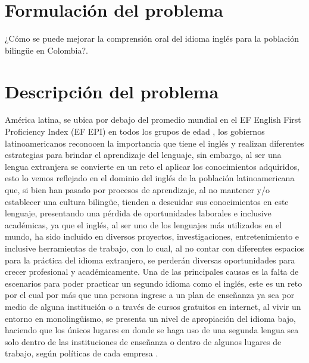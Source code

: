 \section{Formulación del problema}
¿Cómo se puede mejorar la comprensión oral del idioma inglés para la población bilingüe en Colombia?.
\medskip

\section{Descripción del problema}
América latina, se ubica por debajo del promedio mundial en el EF English First Proficiency Index (EF EPI) en todos los grupos de edad \cite{icfes2022informe}, los gobiernos latinoamericanos reconocen la importancia que tiene el inglés y realizan diferentes estrategias para brindar el aprendizaje del lenguaje, sin embargo, al ser una lengua extranjera se convierte en un reto el aplicar los conocimientos adquiridos, esto lo vemos reflejado en el dominio del inglés de la población latinoamericana que, si bien han pasado por procesos de aprendizaje, al no mantener y/o establecer una cultura bilingüe, tienden a descuidar sus conocimientos en este lenguaje, presentando una pérdida de oportunidades laborales e inclusive académicas, ya que el inglés, al ser uno de los lenguajes más utilizados en el mundo, ha sido incluido en diversos proyectos, investigaciones, entretenimiento e inclusive herramientas de trabajo, con lo cual, al no contar con diferentes espacios para la práctica del idioma extranjero, se perderán diversas oportunidades para crecer profesional y académicamente. Una de las principales causas es la falta de escenarios para poder practicar un segundo idioma como el inglés, este es un reto por el cual por más que una persona ingrese a un plan de enseñanza ya sea por medio de alguna institución o a través de cursos gratuitos en internet, al vivir un entorno en monolingüismo, se presenta un nivel de apropiación del idioma bajo, haciendo que los únicos lugares en donde se haga uso de una segunda lengua sea solo dentro de las instituciones de enseñanza o dentro de algunos lugares de trabajo, según políticas de cada empresa \cite{cronquist2017aprendizaje}.
\\
\\
